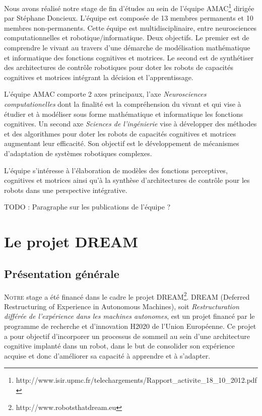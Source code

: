 \documentclass[draft]{llncs}
\begin{document}
Nous avons réalisé notre stage de fin d'études au sein de l'équipe AMAC\footnote{http://www.isir.upmc.fr/telechargements/Rapport\_activite\_18\_10\_2012.pdf} dirigée par Stéphane Doncieux.
L'équipe est composée de 13 membres permanents et 10 membres non-permanents.
Cette équipe est multidisciplinaire, entre neurosciences computationnelles et robotique/informatique.
Deux objectifs. 
Le premier est de comprendre le vivant au travers d’une démarche de modélisation mathématique et informatique des fonctions cognitives et motrices.
Le second est de synthétiser des architectures de contrôle robotiques pour doter les robots de capacités cognitives et motrices intégrant la décision et l’apprentissage.

L'équipe AMAC comporte 2 axes principaux, l'axe \textit{Neurosciences computationelles} dont la finalité est la compréhension du vivant et qui vise à étudier et à modéliser sous forme mathématique et informatique les fonctions cognitives.
Un second axe \textit{Sciences de l'ingénierie} vise à développer des méthodes et des algorithmes pour doter les robots de capacités cognitives et motrices augmentant leur efficacité. Son objectif est le développement de mécanismes d'adaptation de systèmes robotiques complexes.
 
L’équipe s’intéresse à l’élaboration de modèles des fonctions perceptives, cognitives et motrices ainsi qu’à la synthèse d’architectures de contrôle pour les robots dans une perspective intégrative.


TODO : Paragraphe sur les publications de l'équipe ?



\section{Le projet DREAM}

\subsection{Présentation générale}

\lettrine{N}{otre} stage a été financé dans le cadre le projet DREAM\footnote{http://www.robotsthatdream.eu}.
DREAM (Deferred Restructuring of Experience in Autonomous Machines), soit \textit{Restructuration différée de l'expérience dans les machines autonomes}, est un projet financé par le programme de recherche et d'innovation H2020 de l'Union Européenne.
Ce projet a pour objectif d'incorporer un processus de sommeil au sein d'une architecture cognitive implanté dans un robot, dans le but de consolider son expérience acquise et donc d'améliorer sa capacité à apprendre et à s'adapter.
\end{document}
